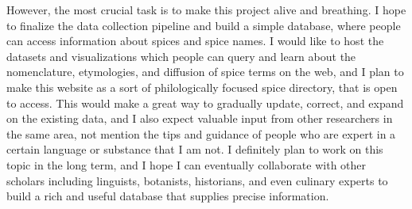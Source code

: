 However, the most crucial task is to make this project alive and breathing. I hope to finalize the data collection pipeline and build a simple database, where people can access information about spices and spice names. I would like to host the datasets and visualizations which people can query and learn about the nomenclature, etymologies, and diffusion of spice terms on the web, and I plan to make this website as a sort of philologically focused spice directory, that is open to access. This would make a great way to gradually update, correct, and expand on the existing data, and I also expect valuable input from other researchers in the same area, not mention the tips and guidance of people who are expert in a certain language or substance that I am not. I definitely plan to work on this topic in the long term, and I hope I can eventually collaborate with other scholars including linguists, botanists, historians, and even culinary experts to build a rich and useful database that supplies precise information.












